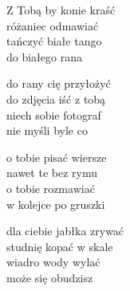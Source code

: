 \begin{text}
    Z Tobą by konie kraść\\
    różaniec odmawiać\\
    tańczyć białe tango\\
    do białego rana

    do rany cię przyłożyć\\
    do zdjęcia iść z tobą\\
    niech sobie fotograf\\
    nie myśli byle co

    o tobie pisać wiersze\\
    nawet te bez rymu\\
    o tobie rozmawiać\\
    w kolejce po gruszki

    dla ciebie jabłka zrywać\\
    studnię kopać w skale\\
    wiadro wody wylać\\
    może się obudzisz
\end{text}
\begin{chord}

\end{chord}